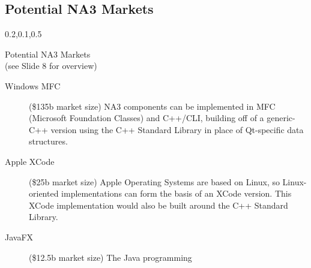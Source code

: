 
\begin{frame}{}
\section{Potential NA3 Markets}

\vspace{-3.5em}	


	
{\Large{}\selectfont
\vspace{1em}
\begin{center}
\begin{minipage}{\textwidth}
\vspace{1em}
{\begin{minipage}{\textwidth}%
\begin{lightquadblockc}{0.2,0.1,0.5}{\parbox{21cm}{\vspace*{10pt}\centering Potential NA3 Markets \\(see Slide 8 for overview)\vspace*{10pt}}}
\hspace{10pt}\begin{minipage}{1.08\textwidth}
{\LARGE {}\selectfont \setlength{\leftmargini}{3pt}\begin{description}
\item[Windows MFC] ({\texttildelow}\$135b market size) NA3 components can be implemented 
in MFC (Microsoft Foundation Classes) and C++/CLI, building off of a generic-C++ version using 
the C++ Standard Library in place of Qt-specific data structures.\vspace{10pt} 	
\item[Apple XCode] ({\texttildelow}\$25b market size) Apple Operating Systems 
are based on Linux, so Linux-oriented \AtR{}  implementations can 
form the basis of an XCode version.  This XCode implementation 
would also be built around the C++ Standard Library. \vspace{10pt}
\item[JavaFX] ({\texttildelow}\$12.5b market size)  The Java programming 

\end{description}}
\end{minipage}
\end{lightquadblockc}
\end{minipage}}
\end{minipage}
\end{center}}
\end{frame}

